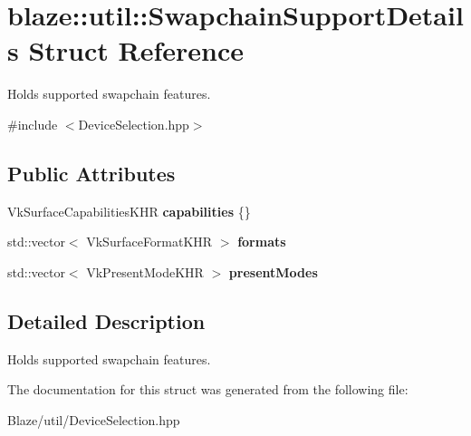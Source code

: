 \hypertarget{structblaze_1_1util_1_1SwapchainSupportDetails}{}\section{blaze\+:\+:util\+:\+:Swapchain\+Support\+Details Struct Reference}
\label{structblaze_1_1util_1_1SwapchainSupportDetails}


Holds supported swapchain features.  




{\ttfamily \#include $<$Device\+Selection.\+hpp$>$}

\subsection*{Public Attributes}
\begin{DoxyCompactItemize}
\item 
\mbox{\label{structblaze_1_1util_1_1SwapchainSupportDetails_acb0776fd24647f6102e1e308efdfd25c}} 
Vk\+Surface\+Capabilities\+K\+HR {\bfseries capabilities} \{\}
\item 
\mbox{\label{structblaze_1_1util_1_1SwapchainSupportDetails_a4bc20cacc83f2ae84dd4228211bc0529}} 
std\+::vector$<$ Vk\+Surface\+Format\+K\+HR $>$ {\bfseries formats}
\item 
\mbox{\label{structblaze_1_1util_1_1SwapchainSupportDetails_a56b120c08340305a41a3fa534e2a598f}} 
std\+::vector$<$ Vk\+Present\+Mode\+K\+HR $>$ {\bfseries present\+Modes}
\end{DoxyCompactItemize}


\subsection{Detailed Description}
Holds supported swapchain features. 

The documentation for this struct was generated from the following file\+:\begin{DoxyCompactItemize}
\item 
Blaze/util/Device\+Selection.\+hpp\end{DoxyCompactItemize}
